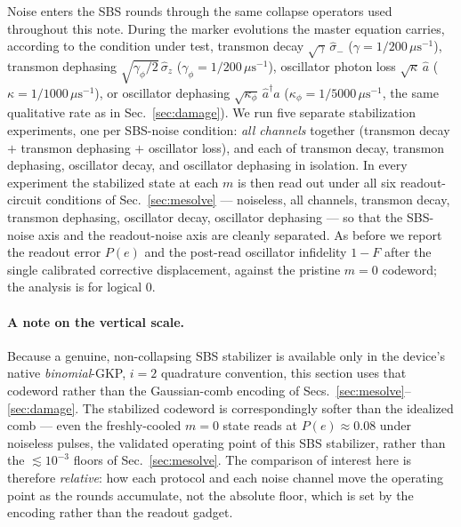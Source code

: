 \documentclass[11pt]{article}
\begin{document}
Noise enters the SBS rounds through the same collapse operators used throughout this note. During
the marker evolutions the master equation carries, according to the condition under test, transmon
decay $\sqrt{\gamma}\,\hat\sigma_-$ ($\gamma=1/200\,\mu\mathrm{s}^{-1}$), transmon dephasing
$\sqrt{\gamma_\phi/2}\,\hat\sigma_z$ ($\gamma_\phi=1/200\,\mu\mathrm{s}^{-1}$), oscillator photon
loss $\sqrt{\kappa}\,\hat a$ ($\kappa=1/1000\,\mu\mathrm{s}^{-1}$), or oscillator dephasing
$\sqrt{\kappa_\phi}\,\hat a^\dagger\hat a$ ($\kappa_\phi=1/5000\,\mu\mathrm{s}^{-1}$, the same
qualitative rate as in Sec.~\ref{sec:damage}). We run five separate stabilization experiments, one
per SBS-noise condition: \emph{all channels} together (transmon decay $+$ transmon dephasing $+$
oscillator loss), and each of transmon decay, transmon dephasing, oscillator decay, and oscillator
dephasing in isolation. In every experiment the stabilized state at each $m$ is then read out under
all six readout-circuit conditions of Sec.~\ref{sec:mesolve} --- noiseless, all channels, transmon
decay, transmon dephasing, oscillator decay, oscillator dephasing --- so that the SBS-noise axis
and the readout-noise axis are cleanly separated. As before we report the readout error $P(e)$ and
the post-read oscillator infidelity $1-F$ after the single calibrated corrective displacement,
against the pristine $m=0$ codeword; the analysis is for logical $0$.

\paragraph{A note on the vertical scale.} Because a genuine, non-collapsing SBS stabilizer is
available only in the device's native \emph{binomial}-GKP, $i=2$ quadrature convention, this
section uses that codeword rather than the Gaussian-comb encoding of
Secs.~\ref{sec:mesolve}--\ref{sec:damage}. The stabilized codeword is correspondingly softer than
the idealized comb --- even the freshly-cooled $m=0$ state reads at $P(e)\approx0.08$ under
noiseless pulses, the validated operating point of this SBS stabilizer, rather than the
$\lesssim10^{-3}$ floors of Sec.~\ref{sec:mesolve}. The comparison of interest here is therefore
\emph{relative}: how each protocol and each noise channel move the operating point as the rounds
accumulate, not the absolute floor, which is set by the encoding rather than the readout gadget.
\end{document}
